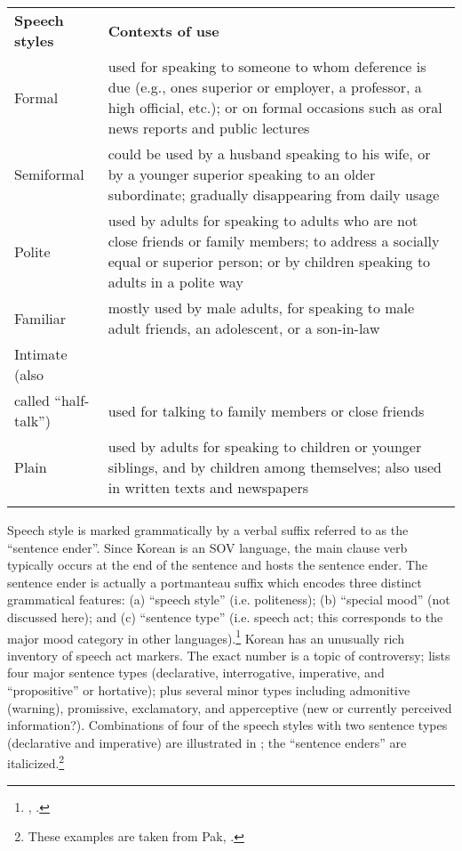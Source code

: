 \begin{tabularx}{\textwidth}{XX}
\lsptoprule

 \bfseries Speech styles & \bfseries Contexts of use\\
 Formal & used for speaking to someone to whom deference is due (e.g., ones superior or employer, a professor, a high official, etc.); or on formal occasions such as oral news reports and public lectures\\
 Semiformal & could be used by a husband speaking to his wife, or by a younger superior speaking to an older subordinate; gradually disappearing from daily usage\\
 Polite & used by adults for speaking to adults who are not close friends or family members; to address a socially equal or superior person; or by children speaking to adults in a polite way\\
 Familiar & mostly used by male adults, for speaking to male adult friends, an adolescent, or a son-in-law\\
 Intimate (also\\
called “half-talk”) & used for talking to family members or close friends\\
 Plain & used by adults for speaking to children or younger siblings, and by children among themselves; also used in written texts and newspapers\\
\lspbottomrule
\end{tabularx}

Speech style is marked grammatically by a verbal suffix referred to as the “sentence ender”. Since Korean is an SOV language, the main clause verb typically occurs at the end of the sentence and hosts the sentence ender. The sentence ender is actually a portmanteau suffix which encodes three distinct grammatical features: (a) “speech style” (i.e. politeness); (b) “special mood” (not discussed here); and (c) “sentence type” (i.e. speech act; this corresponds to the major mood category in other languages).\footnote{\citet{Sohn1999}, \citet{Pak2008}.} Korean has an unusually rich inventory of speech act markers. The exact number is a topic of controversy; \citet{Sohn1999} lists four major sentence types (declarative, interrogative, imperative, and “propositive” or hortative); plus several minor types including admonitive (warning), promissive, exclamatory, and apperceptive (new or currently perceived information?). Combinations of four of the speech styles with two sentence types (declarative and imperative) are illustrated in ; the “sentence enders” are italicized.\footnote{These examples are taken from Pak, \citet{PortnerZanuttini2013}.}




